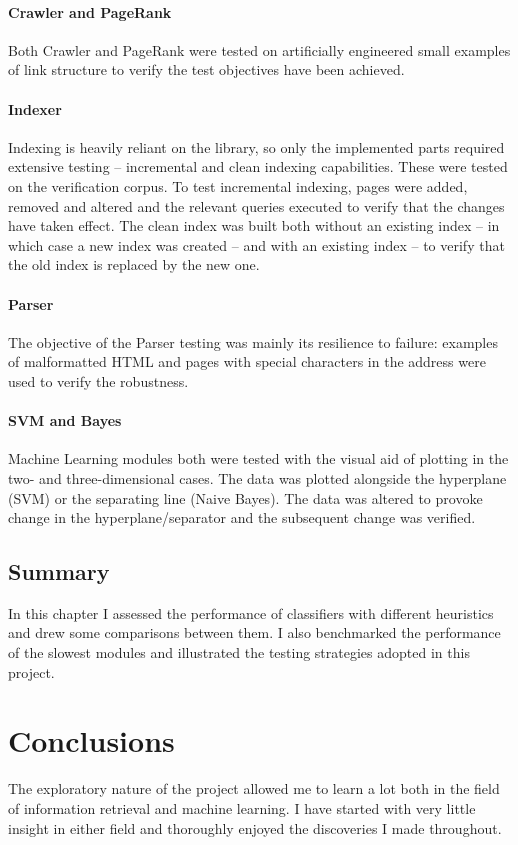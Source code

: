 \documentclass[12pt,a4paper,notitlepage,twoside]{scrbook}
\begin{document}
\subsubsection{Crawler and PageRank} Both Crawler and PageRank were tested on artificially
engineered small examples of link structure to verify the test objectives have been
achieved.  \subsubsection{Indexer} Indexing is heavily reliant on the library, so only the
implemented parts required extensive testing -- incremental and clean indexing
capabilities. These were tested on the verification corpus.  To test incremental indexing,
pages were added, removed and altered and the relevant queries executed to verify that the
changes have taken effect. The clean index was built both without an existing index -- in
which case a new index was created -- and with an existing index -- to verify that the old
index is replaced by the new one.  \subsubsection{Parser} The objective of the Parser
testing was mainly its resilience to failure: examples of malformatted HTML and pages with
special characters in the address were used to verify the robustness. \subsubsection{SVM
and Bayes} Machine Learning modules both were tested with the visual aid of plotting in
the two- and three-dimensional cases. The data was plotted alongside the hyperplane (SVM)
or the separating line (Naive Bayes). The data was altered to provoke change in the
hyperplane/separator and the subsequent change was verified.
\section{Summary}
In this chapter I assessed the performance of classifiers with different
heuristics and drew some comparisons between them. I also benchmarked the
performance of the slowest modules and illustrated the testing strategies
adopted in this project.

\chapter{Conclusions}
The exploratory nature of the project allowed me to learn a lot both in the field of
information retrieval and machine learning. I have started with very little insight in
either field and thoroughly enjoyed the discoveries I made throughout.
\end{document}
